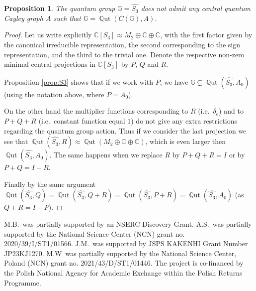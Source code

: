 \documentclass[12pt]{amsart}
\newtheorem{prop}[thm]{Proposition}
\theoremstyle{definition}
\theoremstyle{definition}
\theoremstyle{definition}
\theoremstyle{definition}
\DeclareMathOperator{\Qut}{\mathbb{Q}ut}
\newcommand{\G}{\mathbb{G}}
\newcommand{\C}{\mathbb{C}}
\newcommand{\Cst}{\textrm{C}^\ast}
\numberwithin{equation}{section}
\begin{document}
\begin{prop} \label{prop:noncentral}
The quantum group $\G=\widehat{S_3}$ does not admit any \emph{central} quantum Cayley graph $A$ such that $\G= \Qut(C(\G), A)$. 
\end{prop}
\begin{proof}
Let us write explicitly $\mathbb{C}[S_3] \approx M_2 \oplus \C \oplus \C$, with the first factor given by the canonical irreducible representation, the second corresponding to the sign representation, and the third to the trivial one. Denote the respective non-zero minimal central projections in $\mathbb{C}[S_3]$ by $P$, $Q$ and $R$.

Proposition \ref{prop:S3} shows that if we work with $P$, we have   $\G \subsetneq\Qut(\widehat{S_3}, A_0)$ (using the notation above, where $P=A_0$). 

On the other hand the multiplier functions corresponding to $R$ (i.e.\ $\delta_e$) and to $P+Q+R$ (i.e.\ constant function equal $1$) do not give any  extra restrictions regarding the quantum group action.
Thus if we consider the last projection we see that $\Qut(\widehat{S_3}, R) \approx \Qut(M_2 \oplus \C \oplus \C)$, which is even larger then $\Qut(\widehat{S_3}, A_0)$. The same happens when we replace $R$ by $P+Q+R=I$ or by $P+Q=I-R$. 

Finally by the same argument $\Qut(\widehat{S_3}, Q) = \Qut(\widehat{S_3}, Q+R)  = \Qut(\widehat{S_3}, P+R) = \Qut(\widehat{S_3}, A_0)$ (as $Q+R= I-P$).
\end{proof}

\smallskip
{} M.B.\ was partially supported by an NSERC Discovery Grant.  A.S.\ was partially supported by the National Science Center (NCN) grant no. 2020/39/I/ST1/01566.
J.M.\ was supported by JSPS KAKENHI Grant Number JP23KJ1270. M.W\ was partially supported by the National Science Center, Poland (NCN) grant no. 2021/43/D/ST1/01446. 
The project is co-financed by the Polish National Agency for Academic Exchange within the Polish Returns Programme. 
\end{document}

